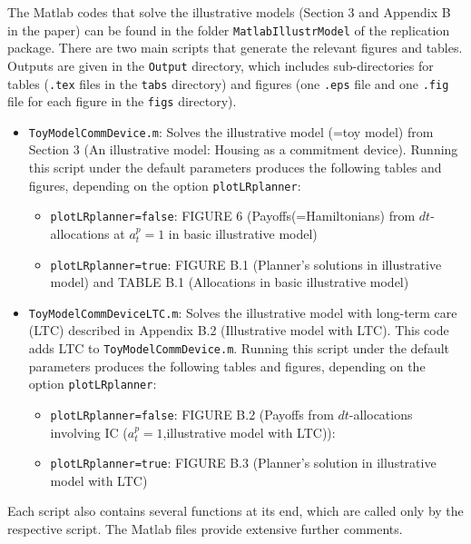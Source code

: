 \documentclass[a4,12p]{article}
\begin{document}
The Matlab codes that solve the illustrative models (Section 3 and Appendix B in the paper) can be found in the folder \texttt{MatlabIllustrModel} of the replication package. There are two main scripts that generate the relevant figures and tables. Outputs are given in the {\tt Output} directory, which includes sub-directories for tables ({\tt .tex} files in the {\tt tabs} directory) and figures (one {\tt .eps} file and one {\tt .fig} file for each figure in the {\tt figs} directory).
\begin{itemize}
	\item \texttt{ToyModelCommDevice.m}: Solves the illustrative model (=toy model) from Section 3 (An illustrative
	model: Housing as a commitment device). Running this script under the default parameters produces	the following tables and figures, depending on the option \texttt{plotLRplanner}:
	\begin{itemize}
	\item  \texttt{plotLRplanner=false}: FIGURE 6 (Payoffs(=Hamiltonians) from $dt$-allocations at $a^p_t=1$ in basic illustrative model)
	
	\item  \texttt{plotLRplanner=true}: FIGURE B.1 (Planner’s solutions in illustrative model) and TABLE B.1 (Allocations in basic illustrative model) 

	\end{itemize}
	
	\item \texttt{ToyModelCommDeviceLTC.m}: Solves the illustrative model with long-term care (LTC) described in
	Appendix B.2 (Illustrative model with LTC). This code adds LTC to \texttt{ToyModelCommDevice.m}. 
	Running this script under the default parameters produces
	the following tables and figures, depending on the option \texttt{plotLRplanner}:
	\begin{itemize}
		\item  \texttt{plotLRplanner=false}: FIGURE B.2 (Payoffs from $dt$-allocations involving IC ($a^p_t =1$,illustrative model with LTC)):
		
		\item  \texttt{plotLRplanner=true}: FIGURE B.3 (Planner’s solution in 
			 illustrative model with LTC)
		
	\end{itemize}

\end{itemize}
Each script also contains several functions at its end, which are called only by the respective script. The Matlab files provide extensive further comments.
\end{document}
